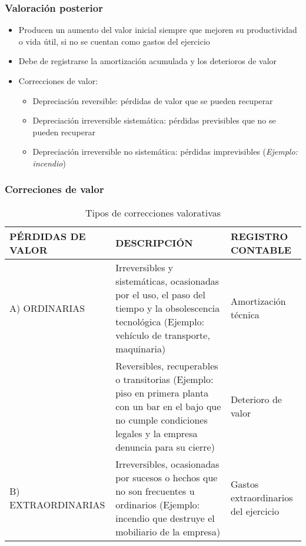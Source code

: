 \documentclass[a4paper,12pt]{article}
\begin{document}
\subsubsection{Valoración posterior}
\begin{itemize}
    \item Producen un aumento del valor inicial siempre que mejoren su productividad o vida útil, si no se cuentan como gastos del ejercicio
    \item Debe de registrarse la amortización acumulada y los deterioros de valor
    \item Correcciones de valor:
    \begin{itemize}
        \item Depreciación reversible: pérdidas de valor que se pueden recuperar
        \item Depreciación irreversible sistemática: pérdidas previsibles que no se pueden recuperar
        \item Depreciación irreversible no sistemática: pérdidas imprevisibles (\textit{Ejemplo: incendio})
    \end{itemize}
\end{itemize}

\subsubsection{Correciones de valor}


\begin{table}[H]
\centering
\caption{Tipos de correcciones valorativas}
\begin{tabular}{|p{4.5cm}|p{7.5cm}|p{4.5cm}|}
\hline
\textbf{PÉRDIDAS DE VALOR} & \textbf{DESCRIPCIÓN} & \textbf{REGISTRO CONTABLE} \\
\hline
A) ORDINARIAS & Irreversibles y sistemáticas, ocasionadas por el uso, el paso del tiempo y la obsolescencia tecnológica \newline (Ejemplo: vehículo de transporte, maquinaria) & Amortización técnica \\
\cline{2-3}
 & Reversibles, recuperables o transitorias \newline (Ejemplo: piso en primera planta con un bar en el bajo que no cumple condiciones legales y la empresa denuncia para su cierre) & Deterioro de valor \\
\hline
B) EXTRAORDINARIAS & Irreversibles, ocasionadas por sucesos o hechos que no son frecuentes u ordinarios \newline (Ejemplo: incendio que destruye el mobiliario de la empresa) & Gastos extraordinarios del ejercicio \\
\hline
\end{tabular}
\end{table}
\end{document}
